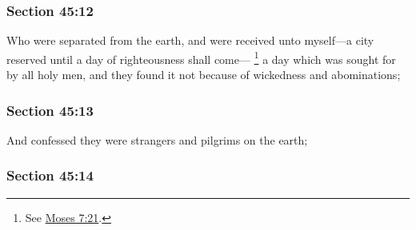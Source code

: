 
	\subsubsection{Section 45:12} %
		\label{DC45-12}

		Who were separated from the earth, and were received unto myself---a city reserved until a day of righteousness shall come---%
			\footnote{%
				See \hyperref[MOSES-7-21]{Moses 7:21}.
				}%
		a day which was sought for by all holy men, and they found it not because of wickedness and abominations;


	\subsubsection{Section 45:13} %
		\label{DC45-13}

		And confessed they were strangers and pilgrims on the earth;


	\subsubsection{Section 45:14} %
		\label{DC45-14}

